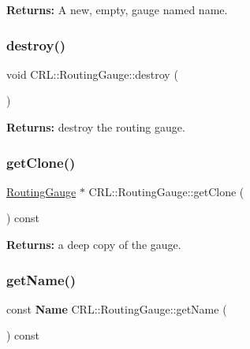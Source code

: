{\bfseries Returns\+:} A new, empty, gauge named {\ttfamily name}. \mbox{\label{classCRL_1_1RoutingGauge_a4726a734f9aff09873c4034e5169a93a}} 
\subsubsection{\texorpdfstring{destroy()}{destroy()}}
{\footnotesize\ttfamily void C\+R\+L\+::\+Routing\+Gauge\+::destroy (\begin{DoxyParamCaption}{ }\end{DoxyParamCaption})\hspace{0.3cm}{\ttfamily [virtual]}}

{\bfseries Returns\+:} destroy the routing gauge. \mbox{\label{classCRL_1_1RoutingGauge_a210f2ca35bdb8c8e0ccb3a671659554e}} 
\subsubsection{\texorpdfstring{get\+Clone()}{getClone()}}
{\footnotesize\ttfamily \mbox{\hyperlink{classCRL_1_1RoutingGauge}{Routing\+Gauge}} $\ast$ C\+R\+L\+::\+Routing\+Gauge\+::get\+Clone (\begin{DoxyParamCaption}{ }\end{DoxyParamCaption}) const}

{\bfseries Returns\+:} a deep copy of the gauge. \mbox{\label{classCRL_1_1RoutingGauge_a9a8eb201ffaca26bb563f7a34846c0c4}} 
\subsubsection{\texorpdfstring{get\+Name()}{getName()}}
{\footnotesize\ttfamily const \textbf{ Name} C\+R\+L\+::\+Routing\+Gauge\+::get\+Name (\begin{DoxyParamCaption}{ }\end{DoxyParamCaption}) const\hspace{0.3cm}{\ttfamily [inline]}}

